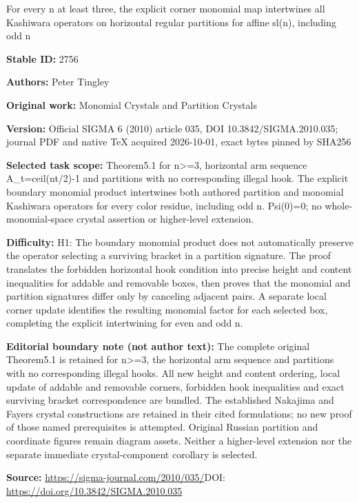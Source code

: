 \documentclass[11pt]{article}
\theoremstyle{definition}
\begin{document}
\begin{center}\Large For every n at least three, the explicit corner monomial map intertwines all Kashiwara operators on horizontal regular partitions for affine sl(n), including odd n\end{center}
\noindent\textbf{Stable ID:} 2756\par
\noindent\textbf{Authors:} Peter Tingley\par
\noindent\textbf{Original work:} Monomial Crystals and Partition Crystals\par
\noindent\textbf{Version:} Official SIGMA 6 (2010) article 035, DOI 10.3842/SIGMA.2010.035; journal PDF and native TeX acquired 2026-10-01, exact bytes pinned by SHA256\par
\noindent\textbf{Selected task scope:} Theorem5.1 for n>=\allowbreak{}3, horizontal arm sequence A\_t=\allowbreak{}ceil(nt/2)-1 and partitions with no corresponding illegal hook. The explicit boundary monomial product intertwines both authored partition and monomial Kashiwara operators for every color residue, including odd n. Psi(0)=\allowbreak{}0; no whole-monomial-space crystal assertion or higher-level extension.\par
\noindent\textbf{Difficulty:} H1: The boundary monomial product does not automatically preserve the operator selecting a surviving bracket in a partition signature. The proof translates the forbidden horizontal hook condition into precise height and content inequalities for addable and removable boxes, then proves that the monomial and partition signatures differ only by canceling adjacent pairs. A separate local corner update identifies the resulting monomial factor for each selected box, completing the explicit intertwining for even and odd n.\par
\noindent\textbf{Editorial boundary note (not author text):} The complete original Theorem5.1 is retained for n>=\allowbreak{}3, the horizontal arm sequence and partitions with no corresponding illegal hooks. All new height and content ordering, local update of addable and removable corners, forbidden hook inequalities and exact surviving bracket correspondence are bundled. The established Nakajima and Fayers crystal constructions are retained in their cited formulations; no new proof of those named prerequisites is attempted. Original Russian partition and coordinate figures remain diagram assets. Neither a higher-level extension nor the separate immediate crystal-component corollary is selected.\par
\noindent\textbf{Source:} \url{https://sigma-journal.com/2010/035/}\quad DOI: \url{https://doi.org/10.3842/SIGMA.2010.035}\par
\end{document}
